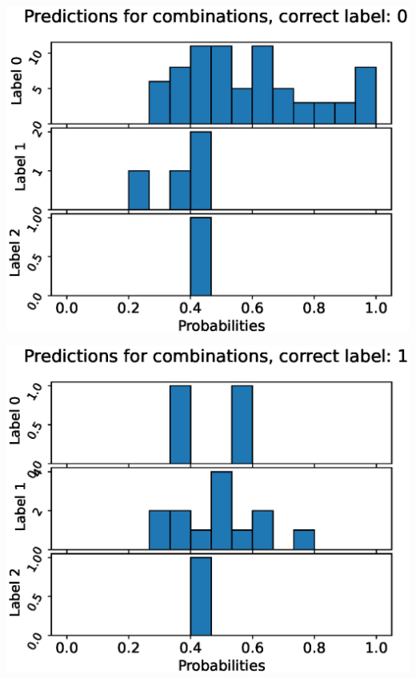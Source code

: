 \begin{center}
\begin{minipage}{0.33\textwidth}
  \includegraphics[width=\textwidth]{files/figs/app/hists/kmfp/pc0.eps}
\end{minipage}%
\begin{minipage}{0.33\textwidth}
  \includegraphics[width=\textwidth]{files/figs/app/hists/kmfp/pc1.eps}
\end{minipage}%
\begin{minipage}{0.33\textwidth}

\end{minipage}
\end{center}
